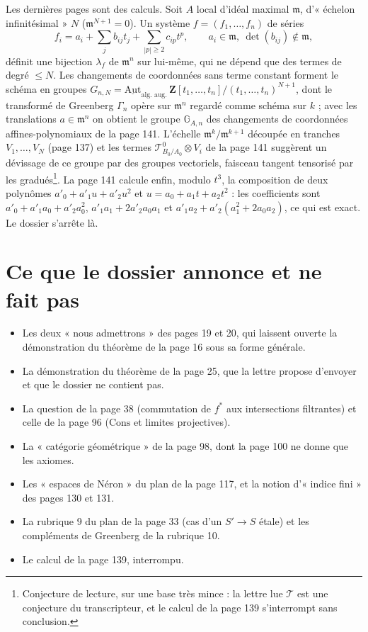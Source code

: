 \documentclass[11pt,a4paper]{article}
\begin{document}
Les dernières pages sont des calculs. Soit $A$ local d'idéal maximal
$\mathfrak{m}$, d'« échelon infinitésimal » $N$ ($\mathfrak{m}^{N+1} = 0$). Un
système $f = (f_1, \ldots, f_n)$ de séries
\[
  f_i = a_i + \sum_j b_{ij} t_j + \sum_{|p| \geq 2} c_{ip} t^{p}, \qquad a_i \in
  \mathfrak{m},\ \det(b_{ij}) \notin \mathfrak{m},
\]
définit une bijection $\lambda_f$ de $\mathfrak{m}^{n}$ sur lui-même, qui ne
dépend que des termes de degré $\leq N$. Les changements de coordonnées sans
terme constant forment le schéma en groupes
$G_{n,N} = \underline{\mathrm{Aut}}_{\text{alg.\ aug.}}\,\mathbf{Z}[t_1, \ldots,
t_n]/(t_1, \ldots, t_n)^{N+1}$, dont le transformé de Greenberg $\Gamma_n$ opère
sur $\mathfrak{m}^n$ regardé comme schéma sur $k$ ; avec les translations
$a \in \mathfrak{m}^n$ on obtient le groupe $\mathbb{G}_{A,n}$ des changements de
coordonnées affines-polynomiaux de la page 141. L'échelle $\mathfrak{m}^k /
\mathfrak{m}^{k+1}$ découpée en tranches $V_1, \ldots, V_N$ (page 137) et les
termes $\mathcal{T}^{0}_{B_0/A_0} \otimes V_i$ de la page 141 suggèrent un
dévissage de ce groupe par des groupes vectoriels, faisceau tangent tensorisé
par les gradués\footnote{Conjecture de lecture, sur une base très mince : la
lettre lue $\mathcal{T}$ est une conjecture du transcripteur, et le calcul de la
page 139 s'interrompt sans conclusion.}. La page 141 calcule enfin, modulo
$t^{3}$, la composition de deux polynômes $a'_0 + a'_1 u + a'_2 u^2$ et $u = a_0
+ a_1 t + a_2 t^2$ : les coefficients sont $a'_0 + a'_1 a_0 + a'_2 a_0^2$, $a'_1
a_1 + 2a'_2 a_0 a_1$ et $a'_1 a_2 + a'_2(a_1^2 + 2 a_0 a_2)$, ce qui est exact. Le
dossier s'arrête là.

\section*{Ce que le dossier annonce et ne fait pas}

\begin{itemize}
  \item Les deux « nous admettrons » des pages 19 et 20, qui laissent
  ouverte la démonstration du théorème de la page 16 sous sa forme générale.
  \item La démonstration du théorème de la page 25, que la lettre propose
  d'envoyer et que le dossier ne contient pas.
  \item La question de la page 38 (commutation de $f^{*}$ aux intersections
  filtrantes) et celle de la page 96 ($\mathrm{Cons}$ et limites projectives).
  \item La « catégorie géométrique » de la page 98, dont la page 100 ne donne
  que les axiomes.
  \item Les « espaces de Néron » du plan de la page 117, et la notion
  d'« indice fini » des pages 130 et 131.
  \item La rubrique 9 du plan de la page 33 (cas d'un $S' \to S$ étale) et les
  compléments de Greenberg de la rubrique 10.
  \item Le calcul de la page 139, interrompu.
\end{itemize}
\end{document}
